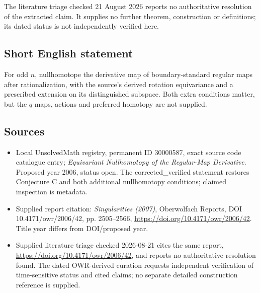 \documentclass[11pt]{article}
\begin{document}
The literature triage checked 21 August 2026 reports no authoritative resolution of the extracted claim. It supplies no further theorem, construction or definitions; its dated status is not independently verified here.
\subsection{Short English statement}
For odd $n$, nullhomotope the derivative map of boundary-standard regular maps after rationalization, with the source's derived rotation equivariance and a prescribed extension on its distinguished subspace. Both extra conditions matter, but the $q$-maps, actions and preferred homotopy are not supplied.
\subsection{Sources}
\begin{itemize}
\item Local UnsolvedMath registry, permanent ID 30000587, exact source code catalogue entry; \emph{Equivariant Nullhomotopy of the Regular-Map Derivative}. Proposed year 2006, status open. The corrected\_verified statement restores Conjecture C and both additional nullhomotopy conditions; claimed inspection is metadata.
\item Supplied report citation: \emph{Singularities (2007)}, Oberwolfach Reports, DOI 10.4171/owr/2006/42, pp. 2505--2566, \url{https://doi.org/10.4171/owr/2006/42}. Title year differs from DOI/proposed year.
\item Supplied literature triage checked 2026-08-21 cites the same report, \url{https://doi.org/10.4171/owr/2006/42}, and reports no authoritative resolution found. The dated OWR-derived curation requests independent verification of time-sensitive status and cited claims; no separate detailed construction reference is supplied.
\end{itemize}
\end{document}
